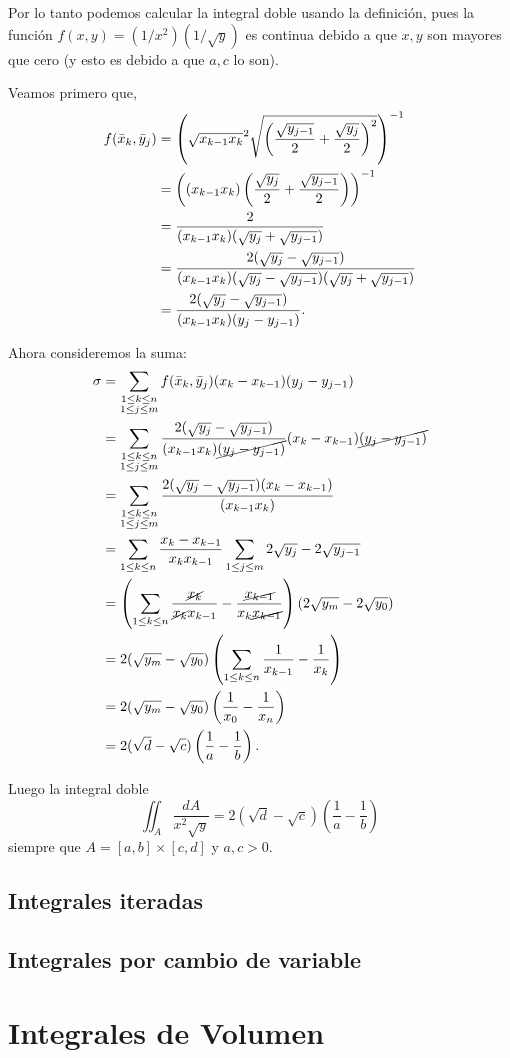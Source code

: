 \documentclass[mid,fleqn,draft,twoside]{notasdeclase}
\newcommand{\inv}{^{-1}}
\renewcommand{\t}{\times}
\begin{document}
\begin{sol}
	Por lo tanto podemos calcular la integral doble usando la definición, pues la función $f(x,y) = (1/x^2) (1/\sqrt{y})$ es continua debido a que $x,y$ son mayores que cero (y esto es debido a que $a,c$ lo son).
	
	Veamos primero que,
	\begin{align*}
		f(\bar x_k,\bar y_j) &= \left( \sqrt{\xkk\xk}^2 \sqrt{\left( \frac{\sqrt{\yjj}}{2} + \frac{\sqrt{\yj}}{2} \right)^2} \right)\inv  \\
		&= \left( (\xkk\xk) \left( \frac{\sqrt{\yj}}{2} + \frac{\sqrt{\yjj}}{2} \right) \right)\inv \\
		&= \frac{2}{(\xkk\xk) ( \sqrt{\yj} + \sqrt{\yjj})} \\
		&= \frac{2(\sqrt{\yj} - \sqrt{\yjj})}{(\xkk\xk)(\sqrt{\yj} - \sqrt{\yjj}) ( \sqrt{\yj} + \sqrt{\yjj} )} \\
		&= \frac{2(\sqrt{\yj} - \sqrt{\yjj})}{(\xkk\xk)(\yj-\yjj)}.
	\end{align*}
	
	Ahora consideremos la suma:
	{\allowdisplaybreaks
	\begin{align*}
		\sigma&= \sum_{\substack{1\leq k\leq n \\ 1\leq j\leq m}} f(\bar x_k,\bar y_j) (x_{k}-x_{k-1})(y_{j}-y_{j-1}) \\
		&= \sum_{\substack{1\leq k\leq n \\ 1\leq j\leq m}} \frac{2(\sqrt{y_{j}} - \sqrt{y_{j-1}})}{(x_{k-1}x_{k})\cancel{(y_{j}-y_{j-1})}} (x_{k}-x_{k-1})\cancel{(y_{j}-y_{j-1})} \\
		&= \sum_{\substack{1\leq k\leq n \\ 1\leq j\leq m}} \frac{2(\sqrt{y_{j}} - \sqrt{y_{j-1}})(x_{k}-x_{k-1})}{(x_{k-1}x_{k})} \\
		&= \sum_{1\leq k\leq n} \frac{x_{k}-x_{k-1}}{x_{k}x_{k-1}} \sum_{1\leq j\leq m}2\sqrt{y_{j}} - 2\sqrt{y_{j-1}} \\
		&= \left( \sum_{1\leq k\leq n} \frac{\cancel{x_{k}}}{\cancel{x_{k}}x_{k-1}} - \frac{\cancel{x_{k-1}}}{x_{k}\cancel{x_{k-1}}} \right) (2\sqrt{y_m}-2\sqrt{y_0}) \\
		&= 2(\sqrt{y_m}-\sqrt{y_0}) \left( \sum_{1\leq k\leq n} \frac{1}{x_{k-1}} - \frac{1}{x_{k}} \right) \\ 
		&= 2(\sqrt{y_m}-\sqrt{y_0}) \left( \frac{1}{x_0} - \frac{1}{x_n}  \right) \\
		&= 2(\sqrt{d} - \sqrt{c})\left( \frac{1}{a} - \frac{1}{b} \right).
	\end{align*}}

	Luego la integral doble
	\[ \iint_{A} \frac{dA}{x^2\sqrt{y}} = 2(\sqrt{d} - \sqrt{c})\left( \frac{1}{a} - \frac{1}{b} \right) \]
	siempre que $A = [a,b]\t[c,d]$ y $a,c>0$.
\end{sol}

\section{Integrales iteradas}
\section{Integrales por cambio de variable}
\chapter{Integrales de Volumen}
\backmatter
\end{document}
